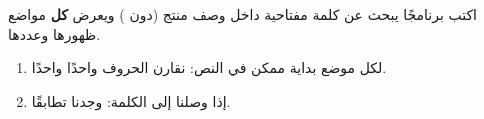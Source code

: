 \begin{statement}
اكتب برنامجًا يبحث عن كلمة مفتاحية داخل وصف منتج (دون ) ويعرض \textbf{كل} مواضع ظهورها وعددها.
\end{statement}
\begin{stepsbox}\begin{enumerate}
\item لكل موضع بداية ممكن  في النص: نقارن الحروف واحدًا واحدًا.
\item إذا وصلنا إلى  الكلمة: وجدنا تطابقًا.
\end{enumerate}\end{stepsbox}
